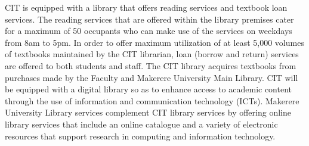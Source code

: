 \documentclass[a4paper,12pt]{article}
\begin{document}
CIT is equipped with a library that offers reading services and textbook loan services. The reading services that are offered within the library premises cater for a maximum of 50 occupants who can make use of the services on weekdays from 8am to 5pm. In order to offer maximum utilization of at least 5,000 volumes of textbooks maintained by the CIT librarian, loan (borrow and return) services are offered to both students and staff. The CIT library acquires textbooks from purchases made by the Faculty and Makerere University Main Library.  CIT will be equipped with a digital library so as to enhance access to academic content through the use of information and communication technology (ICTs). Makerere University Library services complement CIT library services by offering online library services that include an online catalogue and a variety of electronic resources that support research in computing and information technology.
\end{document}
